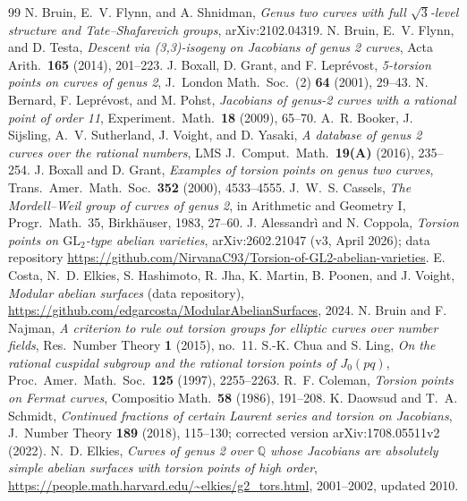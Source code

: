\documentclass[10pt]{amsart}
\begin{document}
\begin{thebibliography}{99}\footnotesize
{} N. Bruin, E.~V. Flynn, and A. Shnidman, \emph{Genus two curves with full $\sqrt{3}$-level structure and Tate--Shafarevich groups}, arXiv:2102.04319.
 N. Bruin, E.~V. Flynn, and D. Testa, \emph{Descent via (3,3)-isogeny on Jacobians of genus 2 curves}, Acta Arith.\ \textbf{165} (2014), 201--223.
 J. Boxall, D. Grant, and F. Lepr\'evost, \emph{5-torsion points on curves of genus 2}, J.~London Math.\ Soc.\ (2) \textbf{64} (2001), 29--43.
 N. Bernard, F. Lepr\'evost, and M. Pohst, \emph{Jacobians of genus-2 curves with a rational point of order 11}, Experiment.\ Math.\ \textbf{18} (2009), 65--70.
 A.~R. Booker, J. Sijsling, A.~V. Sutherland, J. Voight, and D. Yasaki, \emph{A database of genus 2 curves over the rational numbers}, LMS J.~Comput.\ Math.\ \textbf{19(A)} (2016), 235--254.
 J. Boxall and D. Grant, \emph{Examples of torsion points on genus two curves}, Trans.\ Amer.\ Math.\ Soc.\ \textbf{352} (2000), 4533--4555.
 J.~W.~S. Cassels, \emph{The Mordell--Weil group of curves of genus 2}, in Arithmetic and Geometry I, Progr.\ Math.\ 35, Birkh\"auser, 1983, 27--60.
 J. Alessandr\`i and N. Coppola, \emph{Torsion points on $\mathrm{GL}_2$-type abelian varieties}, arXiv:2602.21047 (v3, April 2026); data repository \url{https://github.com/NirvanaC93/Torsion-of-GL2-abelian-varieties}.
 E. Costa, N.~D. Elkies, S. Hashimoto, R. Jha, K. Martin, B. Poonen, and J. Voight, \emph{Modular abelian surfaces} (data repository), \url{https://github.com/edgarcosta/ModularAbelianSurfaces}, 2024.
 N. Bruin and F. Najman, \emph{A criterion to rule out torsion groups for elliptic curves over number fields}, Res.\ Number Theory \textbf{1} (2015), no.~11.
 S.-K. Chua and S. Ling, \emph{On the rational cuspidal subgroup and the rational torsion points of $J_0(pq)$}, Proc.\ Amer.\ Math.\ Soc.\ \textbf{125} (1997), 2255--2263.
 R.~F. Coleman, \emph{Torsion points on Fermat curves}, Compositio Math.\ \textbf{58} (1986), 191--208.
 K. Daowsud and T.~A. Schmidt, \emph{Continued fractions of certain Laurent series and torsion on Jacobians}, J.~Number Theory \textbf{189} (2018), 115--130; corrected version arXiv:1708.05511v2 (2022).
 N.~D. Elkies, \emph{Curves of genus 2 over $\mathbb{Q}$ whose Jacobians are absolutely simple abelian surfaces with torsion points of high order}, \url{https://people.math.harvard.edu/~elkies/g2_tors.html}, 2001--2002, updated 2010.

\end{thebibliography}
\end{document}
